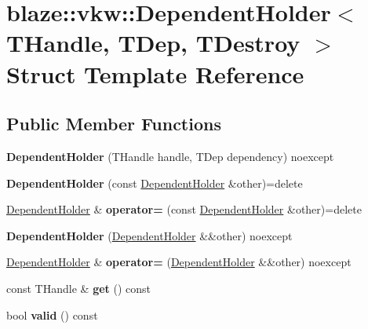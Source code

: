 \hypertarget{structblaze_1_1vkw_1_1DependentHolder}{}\section{blaze\+:\+:vkw\+:\+:Dependent\+Holder$<$ T\+Handle, T\+Dep, T\+Destroy $>$ Struct Template Reference}
\label{structblaze_1_1vkw_1_1DependentHolder}
\subsection*{Public Member Functions}
\begin{DoxyCompactItemize}
\item 
\mbox{\label{structblaze_1_1vkw_1_1DependentHolder_a3052a321b4e426d520750c3e9588bdab}} 
{\bfseries Dependent\+Holder} (T\+Handle handle, T\+Dep dependency) noexcept
\item 
\mbox{\label{structblaze_1_1vkw_1_1DependentHolder_ad5dfa78b398e0171db5f0e76f2665858}} 
{\bfseries Dependent\+Holder} (const \hyperlink{structblaze_1_1vkw_1_1DependentHolder}{Dependent\+Holder} \&other)=delete
\item 
\mbox{\label{structblaze_1_1vkw_1_1DependentHolder_a052ab72184a490ecea08544a8c822cb4}} 
\hyperlink{structblaze_1_1vkw_1_1DependentHolder}{Dependent\+Holder} \& {\bfseries operator=} (const \hyperlink{structblaze_1_1vkw_1_1DependentHolder}{Dependent\+Holder} \&other)=delete
\item 
\mbox{\label{structblaze_1_1vkw_1_1DependentHolder_a67bedeb316f1c1bb66de3efe96d6aecb}} 
{\bfseries Dependent\+Holder} (\hyperlink{structblaze_1_1vkw_1_1DependentHolder}{Dependent\+Holder} \&\&other) noexcept
\item 
\mbox{\label{structblaze_1_1vkw_1_1DependentHolder_a5073830d94fa5ab25afe4dd66a69aa2c}} 
\hyperlink{structblaze_1_1vkw_1_1DependentHolder}{Dependent\+Holder} \& {\bfseries operator=} (\hyperlink{structblaze_1_1vkw_1_1DependentHolder}{Dependent\+Holder} \&\&other) noexcept
\item 
\mbox{\label{structblaze_1_1vkw_1_1DependentHolder_a6636158680e607da1c16b4accc42beb1}} 
const T\+Handle \& {\bfseries get} () const
\item 
\mbox{\label{structblaze_1_1vkw_1_1DependentHolder_ae96ef52dfcd1cbb191a5c2d53214a4a5}} 
bool {\bfseries valid} () const
\end{DoxyCompactItemize}
